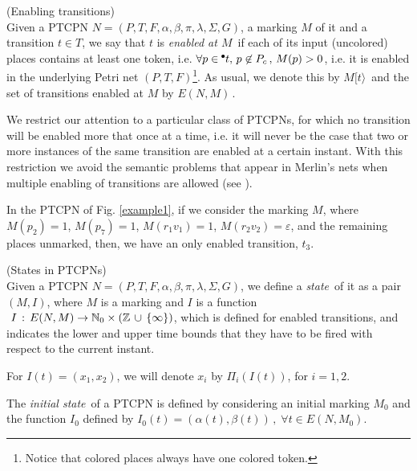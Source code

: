 \begin{definition} (Enabling transitions)\\
Given a PTCPN $N=(P,T,F,\alpha,\beta,\pi,\lambda,\Sigma, G)$, a
marking $M$ of it and a transition $t \in T$, we say that $t$ is
{\em enabled at $M$\,} if each of its input (uncolored) places
contains at least one token, i.e. $\forall p \in \hspace*{-0.4em}~^{\bullet} \hspace*{-0.05em}t,\,
p\not\in P_c\,,\, M(p)>0$, i.e. it is enabled in the underlying
Petri net $(P,T,F)$\footnote{Notice that colored places always have
one colored token.}. As usual, we denote this by $M[t\rangle$\, and
the set of transitions enabled at $M$ by $E(N,M)$\,. \end{definition}

We restrict our attention to a particular class of PTCPNs, for which
no transition will be enabled more that once at a time, i.e. it
will never be the case that two or more instances of the same
transition are enabled at a certain instant. With this restriction
we avoid the semantic problems that appear in Merlin's nets when
multiple enabling of transitions are allowed (see \cite{Wan98}).

\begin{example}\label{ex2} In the PTCPN of Fig. \ref{example1}, if we consider
the marking $M$, where $M(p_2)=1$, $M(p_7)=1$, $M(r_1v_1)=1$,
$M(r_2v_2)=\varepsilon$,  and the remaining places  unmarked, then, we
have an only  enabled transition, $t_3$.
\end{example}

\begin{definition} (States in PTCPNs)\\
Given a PTCPN $N=(P,T,F,\alpha,\beta,\pi,\lambda,\Sigma, G)$, we
define a {\em state}\, of it
as a pair $(M,I)$, where $M$ is a marking and $I$ is a %
function $\,\,I\,:\, E(N,M) \rightarrow \mathbb{N}_{0} \times ( \mathbb{Z }
\,\cup\,\{\infty\})$, which is defined for enabled transitions, and
indicates the lower and upper time bounds that they have to be fired
with respect to the current instant.

For $I(t)=(x_1,x_2)$, we will denote $x_i$ by $\Pi_i(I(t))$, for
$i=1,2$.

The {\em initial state}\, of a PTCPN is defined by considering an
initial marking $M_0$ and the function $I_0$ defined by $I_0(t) =
 (\alpha(t),\beta(t))\,, \; \forall t \in E(N,M_0).
$
\end{definition}

